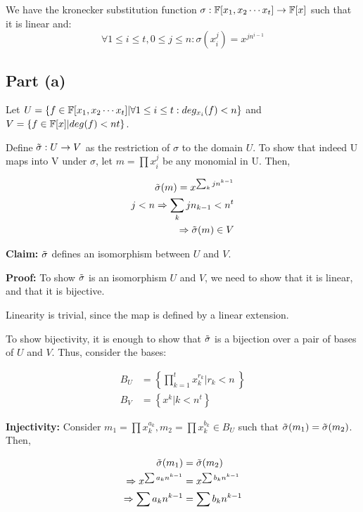 We have the kronecker substitution function $\sigma: \mathbb{F}[x_1, x_2 \cdots x_t] \rightarrow \mathbb{F}[x]$ such that it is linear and:
\[
\forall 1 \le i \le t, 0 \le j \le n: \sigma(x_i^{j}) = x^{j n^{i-1}}
\]

\subsection{Part (a)}
Let $U = \{f \in \mathbb{F}[x_1, x_2 \cdots x_t] \vert \forall 1 \le i \le t: deg_{x_i}(f) < n\}$ and $V = \{f \in \mathbb{F}[x] \vert deg(f) < nt\}$. 

Define $\Tilde{\sigma}: U \rightarrow V$ as the restriction of $\sigma$ to the domain $U$. To show that indeed U maps into V under $\sigma$, let \(m = \prod x_i^j\) be any monomial in U. Then,

\begin{align*}
    \Tilde{\sigma}(m) = x^{\sum_k j n^{k-1}} \\
    j < n \Rightarrow \sum_k j n_{k-1} < n^t \\
    \Rightarrow \Tilde{\sigma}(m) \in V
\end{align*}
\vspace{2\baselineskip}

\textbf{Claim: } $\Tilde{\sigma}$ defines an isomorphism between $U$ and $V$.

\textbf{Proof: } To show $\Tilde{\sigma}$ is an isomorphism $U$ and $V$, we need to show that it is linear, and that it is bijective.

Linearity is trivial, since the map is defined by a linear extension.

To show bijectivity, it is enough to show that $\Tilde{\sigma}$ is a bijection over a pair of bases of $U$ and $V$. Thus, consider the bases:

\begin{align*}
    B_U &= \left\{\prod_{k=1}^t x^{r_k}_k \vert r_k < n\ \right\}\\
    B_V &= \left\{x^k \vert k < n^t\right\}
\end{align*}

\textbf{Injectivity: } Consider $m_1 = \prod x^{a_k}_k, m_2 = \prod x^{b_k}_k \in B_U$ such that $\Tilde{\sigma}(m_1) = \Tilde{\sigma}(m_2)$. Then, 

\begin{align*}
    \Tilde{\sigma}(m_1) &= \Tilde{\sigma}(m_2) \\
    \Rightarrow x^{\sum a_k n^{k-1}} &= x^{\sum b_k n^{k-1}} \\
    \Rightarrow \sum a_k n^{k-1} &= \sum b_k n^{k-1}
\end{align*}

